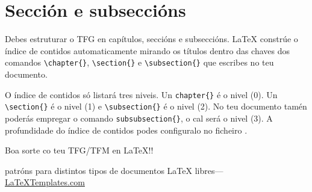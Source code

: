 \section{Sección e subseccións}

Debes estruturar o TFG en capítulos, seccións e subseccións. \LaTeX{} constrúe o índice de contidos automaticamente mirando os títulos dentro das chaves dos comandos \verb|\chapter{}|, \verb|\section{}|  e \verb|\subsection{}| que escribes no teu documento.

O índice de contidos só listará tres niveis. Un \verb|chapter{}| é o nivel (0). Un \verb|\section{}| é o nivel  (1) e \verb|\subsection{}| é o nivel (2). No teu documento tamén poderás empregar o comando \verb|subsubsection{}|, o cal será o nivel (3). A profundidade do índice de contidos podes configuralo no ficheiro .
\vspace{5em}

Boa sorte co teu TFG/TFM en \LaTeX!!
\begin{flushright}
patróns para distintos tipos de documentos \LaTeX{} libres---\\
\href{http://www.LaTeXTemplates.com}{LaTeXTemplates.com}
\end{flushright}
